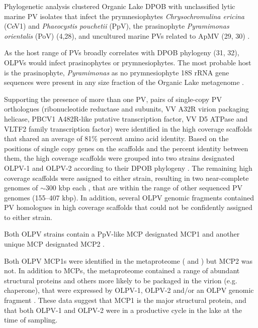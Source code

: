 Phylogenetic analysis clustered Organic Lake \ac{DPOB} with unclassified lytic marine \ac{PV} isolates that infect the prymnesiophytes \emph{Chrysochromulina ericina} (CeV1) and \emph{Phaeocystis pouchetii} (PpV), the prasinophyte \emph{Pyramimonas orientalis} (PoV) (4,28), and uncultured marine \acp{PV} related to \ac{ApMV} (29, 30) . 

As the host range of \acp{PV} broadly correlates with \ac{DPOB} phylogeny (31, 32), \acp{OLPV} would infect prasinophytes or prymnesiophytes. 
The most probable host is the prasinophyte, \emph{Pyramimonas} as no prymnesiophyte 18S \ac{rRNA} gene sequences were present in any size fraction of the Organic Lake metagenome .


Supporting the presence of more than one \ac{PV}, pairs of single-copy \ac{PV} orthologues 
(ribonucleotide reductase \textalpha{} and \textbeta{} subunits, VV A32R virion packaging helicase, \textsc{PBCV1} A482R-like putative transcription factor, VV D5 ATPase and VLTF2 family transcription factor) 
were identified in the high coverage scaffolds that shared an average of 81\% percent amino acid identity.
 Based on the positions of single copy genes on the scaffolds and the percent identity between them, the high coverage scaffolds were grouped into two strains designated \ac{OLPV}-1 and \ac{OLPV}-2 according to their \ac{DPOB} phylogeny .
 The remaining high coverage scaffolds were assigned to either strain, resulting in two near-complete genomes of $\sim$300 kbp each , that are within the range of other sequenced \ac{PV} genomes (155--407 kbp). 
In addition, several \ac{OLPV} genomic fragments contained \ac{PV} homologues in high coverage scaffolds that could not be confidently assigned to either strain. 


Both \ac{OLPV} strains contain a PpV-like \ac{MCP} designated \ac{MCP}1 and another unique \ac{MCP} designated \ac{MCP}2 .

Both \ac{OLPV} \ac{MCP}1s were identified in the metaproteome ( and ) but \ac{MCP}2 was not. 
In addition to \acp{MCP}, the metaproteome contained a range of abundant structural proteins and others more likely to be packaged in the virion (e.g. chaperone), that were expressed by \ac{OLPV}-1, \ac{OLPV}-2 and/or an \ac{OLPV} genomic fragment . 
These data suggest that \ac{MCP}1 is the major structural protein, and that both \ac{OLPV}-1 and \ac{OLPV}-2 were in a productive cycle in the lake at the time of sampling. 


